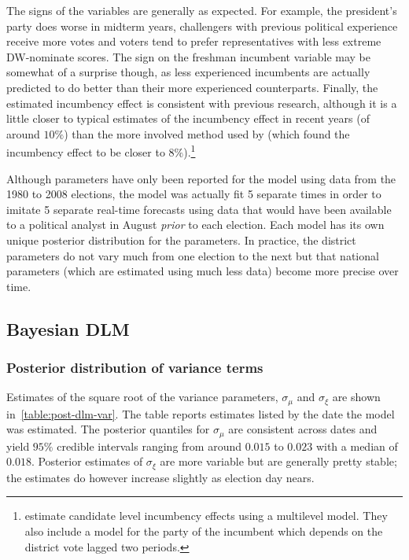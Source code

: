 \documentclass[12pt,final,fleqn]{article}
\theoremstyle{plain}
\begin{document}
The signs of the variables are generally as expected. For example, the president's party does worse in midterm years, challengers with previous political experience receive more votes and voters tend to prefer representatives with less extreme DW-nominate scores. The sign on the freshman incumbent variable may be somewhat of a surprise though, as less experienced incumbents are actually predicted to do better than their more experienced counterparts. Finally, the estimated incumbency effect is consistent with previous research, although it is a little closer to typical estimates of the incumbency effect in recent years (of around $10\%$) than the more involved method used by \citet{gelman2008estimating} (which found the incumbency effect to be closer to $8\%$).\footnote{\citet{gelman2008estimating} estimate candidate level incumbency effects using a multilevel model. They also include a model for the party of the incumbent which depends on the district vote lagged two periods.}

Although parameters have only been reported for the model using data from the 1980 to 2008 elections, the model was actually fit 5 separate times in order to imitate 5 separate real-time forecasts using data that would have been available to a political analyst in August \emph{prior} to each election. Each model has its own unique posterior distribution for the parameters. In practice, the district parameters do not vary much from one election to the next but that national parameters (which are estimated using much less data) become more precise over time. 

\subsection{Bayesian DLM}
\subsubsection{Posterior distribution of variance terms}
Estimates of the square root of the variance parameters, $\sigma_\mu$ and $\sigma_\xi$ are shown in~\autoref{table:post-dlm-var}. The table reports estimates listed by the date the model was estimated. The posterior quantiles for $\sigma_\mu$ are consistent across dates and yield $95\%$ credible intervals ranging from around $0.015$ to  $0.023$ with a median of $0.018$. Posterior estimates of $\sigma_\xi$ are more variable but are generally pretty stable; the estimates do however increase slightly as election day nears.
\end{document}

